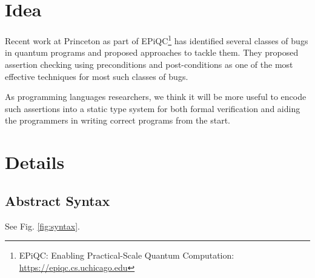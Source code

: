 \documentclass[acmsmall,nonacm,review,timestamp]{acmart}
\begin{document}
\section{Idea}
%

Recent work at Princeton as part of EPiQC\footnote{EPiQC: Enabling Practical-Scale Quantum Computation:  \url{https://epiqc.cs.uchicago.edu}}\cite{huang2018,huang2019} has identified several classes of bugs in quantum programs and proposed approaches to tackle them. They proposed assertion checking using preconditions and post-conditions as one of the most effective techniques for most such classes of bugs.

As programming languages researchers, we think it will be more useful to encode such assertions into a static type system for both formal verification and aiding the programmers in writing correct programs from the start.

\section{Details}

\subsection{Abstract Syntax}


See Fig. \ref{fig:syntax}.
\end{document}
